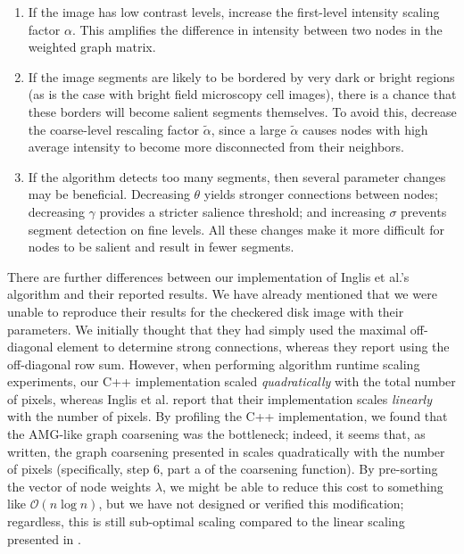 \documentclass[12pt]{article}%
\begin{document}
\begin{enumerate}

\item If the image has low contrast levels, increase the first-level intensity scaling factor $\alpha$. This amplifies the difference in intensity between two nodes in the weighted graph matrix.

\item If the image segments are likely to be bordered by very dark or bright regions (as is the case with bright field microscopy cell images), there is a chance that these borders will become salient segments themselves. To avoid this, decrease the coarse-level rescaling factor $\tilde{\alpha}$, since a large $\tilde{\alpha}$ causes nodes with high average intensity to become more disconnected from their neighbors.

\item If the algorithm detects too many segments, then several parameter changes may be beneficial. Decreasing $\theta$ yields stronger connections between nodes; decreasing $\gamma$ provides a stricter salience threshold; and increasing $\sigma$ prevents segment detection on fine levels. All these changes make it more difficult for nodes to be salient and result in fewer segments.

\end{enumerate}

There are further differences between our implementation of Inglis et al.'s algorithm and their reported results.  We have already mentioned that we were unable to reproduce their results for the checkered disk image with their parameters.  We initially thought that they had simply used the maximal off-diagonal element to determine strong connections, whereas they report using the off-diagonal row sum.  However, when performing algorithm runtime scaling experiments, our C++ implementation scaled \emph{quadratically} with the total number of pixels, whereas Inglis et al. report that their implementation scales \emph{linearly} with the number of pixels.  By profiling the C++ implementation, we found that the AMG-like graph coarsening was the bottleneck; indeed, it seems that, as written, the graph coarsening presented in \cite{inglis:2010} scales quadratically with the number of pixels (specifically, step 6, part a of the coarsening function).  By pre-sorting the vector of node weights $\lambda$, we might be able to reduce this cost to something like $\mathcal{O}(n\log n)$, but we have not designed or verified this modification; regardless, this is still sub-optimal scaling compared to the linear scaling presented in \cite{inglis:2010}.\\
\end{document}
